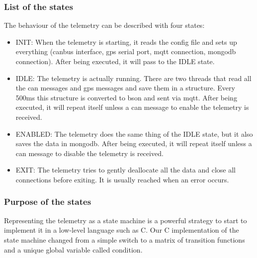 \subsubsection{List of the states}

The behaviour of the telemetry can be described with four states:

\begin{itemize}
    \item INIT: When the telemetry is starting, it reads the config file and sets up everything (canbus interface, gps serial port, mqtt connection, mongodb connection). After being executed, it will pass to the IDLE state.
    \item IDLE: The telemetry is actually running. There are two threads that read all the can messages and gps messages and save them in a structure. Every 500ms this structure is converted to bson and sent via mqtt. After being executed, it will repeat itself unless a can message to enable the telemetry is received.
    \item ENABLED: The telemetry does the same thing of the IDLE state, but it also saves the data in mongodb. After being executed, it will repeat itself unless a can message to disable the telemetry is received.
    \item EXIT: The telemetry tries to gently deallocate all the data and close all connections before exiting. It is usually reached when an error occurs.
\end{itemize}

\subsubsection{Purpose of the states}

Representing the telemetry as a state machine is a powerful strategy to start to implement it in a low-level language such as C. 
Our C implementation of the state machine changed from a simple switch to a matrix of transition functions and a unique global 
variable called condition.